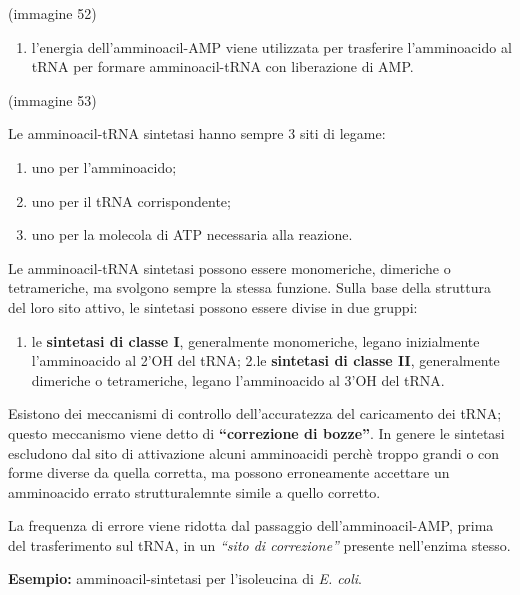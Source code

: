 \documentclass[]{article}
\begin{document}
(immagine 52)

\begin{enumerate}
\def\labelenumi{\arabic{enumi}.}
\setcounter{enumi}{1}
\itemsep1pt\parskip0pt
\item
  l'energia dell'amminoacil-AMP viene utilizzata per trasferire
  l'amminoacido al tRNA per formare amminoacil-tRNA con liberazione di
  AMP.
\end{enumerate}

(immagine 53)

Le amminoacil-tRNA sintetasi hanno sempre 3 siti di legame:

\begin{enumerate}
\def\labelenumi{\arabic{enumi}.}
\itemsep1pt\parskip0pt
\item
  uno per l'amminoacido;
\item
  uno per il tRNA corrispondente;
\item
  uno per la molecola di ATP necessaria alla reazione.
\end{enumerate}

Le amminoacil-tRNA sintetasi possono essere monomeriche, dimeriche o
tetrameriche, ma svolgono sempre la stessa funzione. Sulla base della
struttura del loro sito attivo, le sintetasi possono essere divise in
due gruppi:

\begin{enumerate}
\def\labelenumi{\arabic{enumi}.}
\itemsep1pt\parskip0pt
\item
  le \textbf{sintetasi di classe I}, generalmente monomeriche, legano
  inizialmente l'amminoacido al 2'OH del tRNA; 2.le \textbf{sintetasi di
  classe II}, generalmente dimeriche o tetrameriche, legano
  l'amminoacido al 3'OH del tRNA.
\end{enumerate}

Esistono dei meccanismi di controllo dell'accuratezza del caricamento
dei tRNA; questo meccanismo viene detto di \textbf{``correzione di
bozze''}. In genere le sintetasi escludono dal sito di attivazione
alcuni amminoacidi perchè troppo grandi o con forme diverse da quella
corretta, ma possono erroneamente accettare un amminoacido errato
strutturalemnte simile a quello corretto.

La frequenza di errore viene ridotta dal passaggio dell'amminoacil-AMP,
prima del trasferimento sul tRNA, in un \emph{``sito di correzione''}
presente nell'enzima stesso.

\textbf{Esempio:} amminoacil-sintetasi per l'isoleucina di \emph{E.
coli}.
\end{document}
